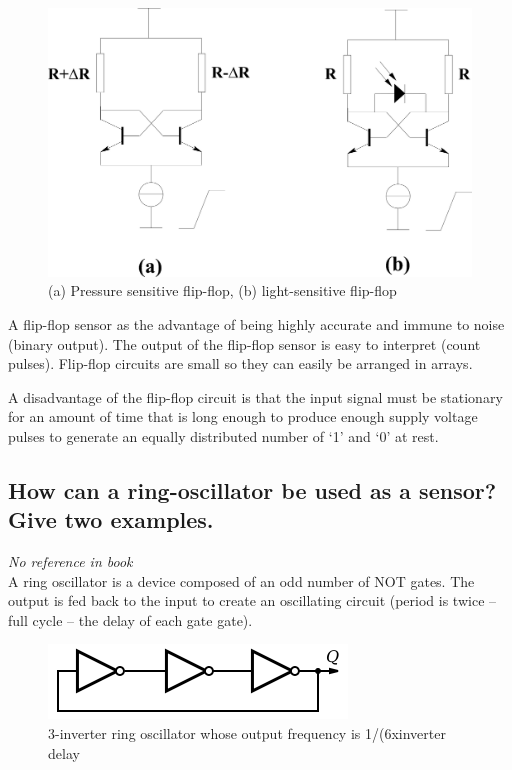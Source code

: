 \documentclass[10pt,a4paper]{article}
\begin{document}
\begin{figure}[h!]
    \centering
    \includegraphics{flip-flop.png}
    \caption{(a) Pressure sensitive flip-flop, (b) light-sensitive flip-flop}
    \label{fig:flip-flop}
\end{figure}

A flip-flop sensor as the advantage of being highly accurate and immune to noise (binary output). The output of the flip-flop sensor is easy to interpret (count pulses). Flip-flop circuits are small so they can easily be arranged in arrays.

A disadvantage of the flip-flop circuit is that the input signal must be stationary for an amount of time that is long enough to produce enough supply voltage pulses to generate an equally distributed number of `1' and `0' at rest. 

\subsection{How can a ring-oscillator be used as a sensor? Give two examples.}

\textit{No reference in book}\\

A ring oscillator is a device composed of an odd number of NOT gates. The output is fed back to the input to create an oscillating circuit (period is twice -- full cycle -- the delay of each gate gate).

\begin{figure}[h!]
    \centering
    \includegraphics{ring.png}
    \caption{3-inverter ring oscillator whose output frequency is 1/(6xinverter delay}
\end{figure}
\end{document}

